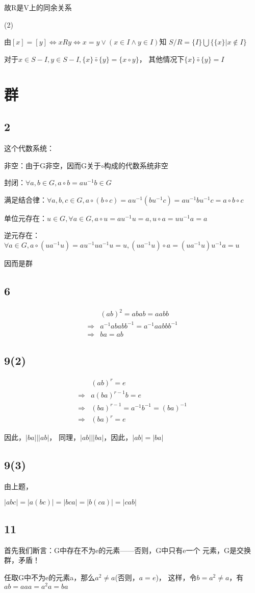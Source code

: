 \documentclass[UTF8]{ctexart}
\begin{document}
故R是V上的同余关系

(2)

由$[x] = [y]\Leftrightarrow xRy\Leftrightarrow x = y
\lor(x\in I\land y\in I)$知
$S/R = \{I\}\bigcup \{\{x\} | x\notin I\}$

对于$x\in S-I, y\in S-I, \{x\}\bar\circ \{y\} = \{x\circ y\}$，
其他情况下$\{x\}\bar \circ \{y\} = I$

\section*{群}

\subsection*{2}

这个代数系统：

非空：由于G非空，因而G关于$\circ$构成的代数系统非空

封闭：$\forall a, b\in G, a\circ b = au^{-1}b\in G$

满足结合律：$\forall a, b, c\in G, a\circ (b\circ c) = 
au^{-1}(bu^{-1}c) = au^{-1}bu^{-1}c = a\circ b\circ c$

单位元存在：$u\in G, \forall a\in G, a\circ u = au^{-1}u = a, 
u\circ a = uu^{-1}a = a$

逆元存在：$\forall a\in G, a\circ (ua^{-1}u) = au^{-1}ua^{-1}u = u, 
(ua^{-1}u)\circ a = (ua^{-1}u)u^{-1}a = u$

因而是群

\subsection*{6}

\[
\begin{aligned}
    &(ab)^2 = abab = aabb\\
    \Rightarrow &a^{-1}ababb^{-1} = a^{-1}aabbb^{-1}\\
    \Rightarrow &ba = ab
\end{aligned}
\]

\subsection*{9(2)}

\[
\begin{aligned}
    &(ab)^r = e\\
    \Rightarrow &a(ba)^{r-1}b = e\\
    \Rightarrow &(ba)^{r-1} = a^{-1}b^{-1} = (ba)^{-1}\\
    \Rightarrow &(ba)^r = e
\end{aligned}    
\]

因此，$|ba|\Big| |ab|$，
同理，$|ab|\Big| |ba|$，因此，$|ab| = |ba|$

\subsection*{9(3)}

由上题，

$|abc| = |a(bc)| = |bca| = |b(ca)| = |cab|$

\subsection*{11}

首先我们断言：G中存在不为e的元素——否则，G中只有e一个
元素，G是交换群，矛盾！

任取G中不为e的元素a，那么$a^2\neq a$(否则，$a = e$)，
这样，令$b = a^2\neq a$，有$ab = aaa = a^2a = ba$
\end{document}
